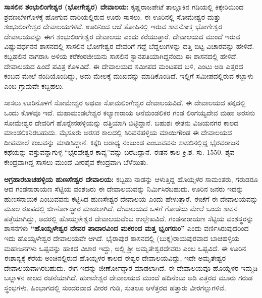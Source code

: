 \textbf{ಸಾಸಲಿನ ಶಂಭುಲಿಂಗೇಶ್ವರ (ಭೋಗೇಶ್ವರ) ದೇವಾಲಯ:} ಕೃಷ್ಣರಾಜಪೇಟೆ ತಾಲ್ಲೂಕಿನ ಗಡಿಯಲ್ಲಿ ಕಿಕ್ಕೇರಿಯಿಂದ ಶ್ರವಣಬೆಳಗೊಳಕ್ಕೆ ಹೋಗುವ ದಾರಿಯಲ್ಲಿರುವ ಊರು ಸಾಸಲು. ಈ ಊರಿನಲ್ಲಿ ಸೋಮೇಶ್ವರ ಮತ್ತು ಶಂಭುಲಿಂಗೇಶ್ವರ ದೇವಾಲಯಗಳಿವೆ. ಊರಿನಿಂದ ಆಚೆ ತೋಪಿನಲ್ಲಿ ಇರುವ ಶಾಸನೋಕ್ತ ಭೋಗೇಶ್ವರ ದೇವಾಲಯವನ್ನು ಈಗ ಶಂಭುಲಿಂಗೇಶ್ವರ ದೇವಾಲಯ ಎಂದು ಕರೆಯುತ್ತಾರೆ. ದೇವಾಲಯದ ಮುಂದೆ ಇರುವ ವಿಷ್ಣುವರ್ಧನನ ಶಾಸನದಲ್ಲಿ ಸಾಸಲಿನ ಭೋಗೇಶ್ವರ ದೇವರಿಗೆ ಗದ್ದೆ ಬೆದ್ದಲುಗಳನ್ನು ದತ್ತಿ ಬಿಟ್ಟ ವಿಚಾರವನ್ನು ಹೇಳಿದೆ. ಕಬ್ಬಹಲಿನ ನಾಗರಾಸಿ ಅಳಿಯ ಕರೆಕಂಠಜೀಯನು ಸಾಸಲಿನ ಸ್ಥಾನಪತಿಯಾಗಿದ್ದನೆಂದು ಈ ಶಾಸನದಲ್ಲಿ ಹೇಳಿದೆ. ದೇವಾಲಯದ ಹಿಂದೆ ಪವಿತ್ರ ಕೊಳವಿದೆ. ಈ ದೇವಾಲಯದ ಸಮೀಪದ ಮಂಟಪದ ಬಳಿ, ಎಂಟು ಅಡಿ ಎತ್ತರದ ಕಂಬದ ಮೇಲೆ ನಂದಿಯೊಂದಿದ್ದು, ಅದು ಮೇಲಕ್ಕೆ ಮುಖವನ್ನು ಮಾಡಿಕೊಂಡಿದೆ. ಇಲ್ಲಿಗೆ ಸಮೀಪದಲ್ಲಿರುವ ಕಬ್ಬಾಳು ಎಂಬ ಗ್ರಾಮವೇ ಕಬ್ಬಹಲು.

ಸಾಸಲು ಊರಿನೊಳಗೆ ಸೋಮೇಶ್ವರ ಅಥವಾ ಸೋಮಲಿಂಗೇಶ್ವರ ದೇವಾಲಯವಿದೆ. ಈ ದೇವಾಲಯದ ಪಕ್ಕದಲ್ಲಿ ಒಂದು ಕೊಳವೂ ಇದೆ. ಮಹಾಮಂಡಲೇಶ್ವರ ಕಲ್ಯಾಣರಾಯ ಆನೆಮಂಡಲಿಕರ ಗಂಡ ಲಿಂಗಯ್ಯದೇವ ಮಹಾ ಅರಸನು ಸೋಮೇಶ್ವರ ದೇವರಿಗೆ ಹೊನ್ನೇನಹಳ್ಳಿಯನ್ನು ದತ್ತಿಯಾಗಿ ಬಿಟ್ಟಿದ್ದಾನೆ. ಬಹುಶಃ ಈತನು ವಿಜಯನಗರ ಕಾಲದ ಮಾಂಡಲಿಕನಿರಬಹುದು. ಮೈಸೂರು ಅರಸರ ಕಾಲದಲ್ಲಿ ಸಿರಿವನಹಳ್ಳಿಯ ಮಾಯಿಗೌಂಡ ಈ ದೇವಾಲಯದ ದೀಪಮಾಲೆ ಕಂಬವನ್ನು ಮಾಡಿಸಿದ್ದಾನೆ. ಕಿಕ್ಕೆರಿ ಆರಾಧ್ಯ ನಂಜುಂಡ ಎಂಬುವವನು ಸಾಸಲಿನಲ್ಲಿದ್ದ ಭೈರವರಾಜನ ಕಥೆಯನ್ನು ವಸ್ತುವನ್ನಾಗುಳ್ಳ “ಭೈರವೇಶ್ವರ ಕಾವ್ಯ”ವನ್ನು ಬರೆದಿದ್ದಾನೆ. ಈತನ ಕಾಲ ಕ್ರಿ.ಶ. ಸು. 1550. ಶೈವ ಕೇಂದ್ರವಾಗಿದ್ದ ಸಾಸಲು ಮುಂದೆ ವೀರಶೈವ ಕೇಂದ್ರವಾಗಿ ಬೆಳೆಯಿತು.

\textbf{ಅಗ್ರಹಾರಬಾಚಹಳ್ಳಿಯ ಹುಣಸೇಶ್ವರ ದೇವಾಲಯ:} ಕಬ್ಬಹು ನಾಡನ್ನು ಆಳುತ್ತಿದ್ದ ಹೊಯ್ಸಳರ ಸಾಮಂತರು, ಗರುಡರೂ ಆದ ಗಂಡನಾರಾಯಣ ಸೆಟ್ಟಿಯ ವಂಶಜರು ಈ ದೇವಾಲಯವನ್ನು ನಿರ್ಮಿಸಿರಬಹುದು. ಊರಿನ ಜನರು ಇದನ್ನು ಹುಣಸನಾಯಕ ಎಂಬುವವನು ಕಟ್ಟಿಸಿದ ಹುಣಸೇಶ್ವರ ದೇವಾಲಯ ಎಂದು ಹೇಳುತ್ತಾರೆ. ಈಚೆಗೆ ಈ ದೇವಾಲಯವನ್ನು ಮೂಲ ರೂಪದಲ್ಲಿ ಜೀರ್ಣೋದ್ಧಾರ ಮಾಡಲಾಗಿದೆ. ದೇವಾಲಯದ ಒಳಗೆ ಗೋಡೆಯ ಮೇಲೆ ಒಂದು ಶಾಸನ ಪತ್ತೆಯಾಗಿದ್ದು, ಅದರಲ್ಲಿ ಹೊಯ್ಸಳೇಶ್ವರ ದೇವಾಲಯವೆಂಬ ಉಲ್ಲೇಖವಿದೆ. ಗಂಡನಾರಾಯಣ ಸೆಟ್ಟಿಯ ವಂಶಸ್ಥರನ್ನು ಶಾಸನಗಳು \textbf{“ಹೊಯ್ಸಳೇಶ್ವರ ದೇವರ ಪಾದಾರವಿಂದ ಮಕರಂದ ಮತ್ತ ಭೃಂಗರುಂ”} ಎಂದು ವರ್ಣಿಸಿರುವುದರಿಂದ ಇದು ಹೊಯ್ಸಳೇಶ್ವರ ದೇವಾಲಯವೇ ಆಗಿದೆ. ಭೈರಾಪುರ ಶಾಸನದಲ್ಲಿ (ಬುಕ್ಕ)ರಾಯಪುರವಾದ ಬಾಚಹಳ್ಳಿಯ ಮಹಾಜನಗಳು ಒಪ್ಪವನ್ನು ಹಾಕಿದ ವಿಚಾರ ಇದ್ದು, ಅಲ್ಲಿ ಶ‍್ರೀ ಅಮೃತೇಶ್ವರದೇವರು ಎಂಬ ಒಪ್ಪವಿದೆ. ಈ ಊರಿನ ಈಶಾನ್ಯಕ್ಕೆ ಕೆರೆಯ ಅಂಚಿನಲ್ಲಿರುವ ಹೊಯ್ಸಳರ ಕಾಲದ ಈಶ್ವರ ದೇವಾಲಯವಿದ್ದು, ಇದೇ ಅಮೃತೇಶ್ವರ ದೇವಾಲಯವಾಗಿರಬಹುದು. ಈಗ ಇದನ್ನು ಜೀರ್ಣೋದ್ಧಾರ ಮಾಡಲಾಗಿದೆ. ಈ ದೇವಾಲಯವೂ ಹೊಯ್ಸಳರ ಇಮ್ಮಡಿ ಬಲ್ಲಾಳನ ಕಾಲದ ರಚನೆಯಾಗಿದೆ. ಹುಣಸೇಶ್ವರ ದೇವಾಲಯದ ಮುಂದೆ ಹದಿನೆಂಟು ಅಡಿ ಎತ್ತರದ ಮೂರು ಗರುಡ ಸ್ಥಂಭಗಳು. ಹಿಂಭಾಗದಲ್ಲಿ ಸುಂದರವಾದ ವೀರರ ಗುಡಿ, ಸುತಲೂ ಆಳೆತ್ತರದ ಹತ್ತಾರು ವೀರಗಲ್ಲುಗಳಿವೆ.

